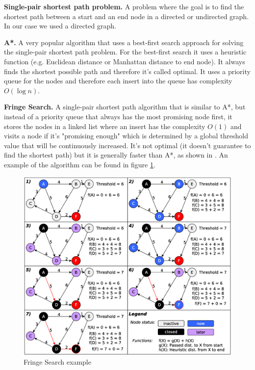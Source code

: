\documentclass[letterpaper]{article}
\newcommand{\mypar}[1]{{\bf #1.}}
\begin{document}
\mypar{Single-pair shortest path problem}
A problem where the goal is to find the shortest path between a start and an end node in a directed or undirected graph. In our case we used a directed graph.

\mypar{A*}
A very popular algorithm that uses a best-first search approach for solving the single-pair shortest path problem. For the best-first search it uses a heuristic function (e.g. Euclidean distance or Manhattan distance to end node). It always finds the shortest possible path and therefore it's called optimal. It uses a priority queue for the nodes and therefore each insert into the queue has complexity $O(\log n)$.

\mypar{Fringe Search}
A single-pair shortest path algorithm that is similar to A*, but instead of a priority queue that always has the most promising node first, it stores the nodes in a linked list where an insert has the complexity $O(1)$ and visits a node if it's "promising enough" which is determined by a global threshold value that will be continuously increased. It's not optimal (it doesn't guarantee to find the shortest path) but it is generally faster than A*, as shown in \cite{fringe:05}. An example of the algorithm can be found in figure \ref{fig:algo}.

\begin{figure}[h]\centering
  \includegraphics[scale=0.245]{fringe_rep.eps}
  \caption{Fringe Search example \label{fig:algo}}
\end{figure}
\end{document}
